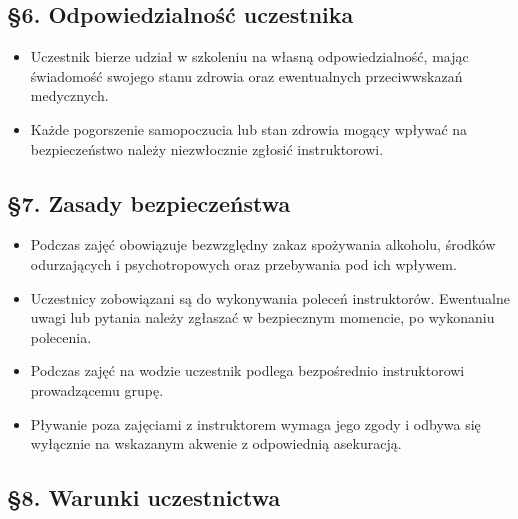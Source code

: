 \subsection*{§6. Odpowiedzialność uczestnika}

\begin{itemize}[leftmargin=1.5em, itemsep=2pt]
  \item Uczestnik bierze udział w szkoleniu na własną odpowiedzialność, mając świadomość
    swojego stanu zdrowia oraz ewentualnych przeciwwskazań medycznych.
  \item Każde pogorszenie samopoczucia lub stan zdrowia mogący wpływać na bezpieczeństwo
    należy niezwłocznie zgłosić instruktorowi.
\end{itemize}

\subsection*{§7. Zasady bezpieczeństwa}

\begin{itemize}[leftmargin=1.5em, itemsep=2pt]
  \item Podczas zajęć obowiązuje bezwzględny zakaz spożywania alkoholu, środków
    odurzających i psychotropowych oraz przebywania pod ich wpływem.
  \item Uczestnicy zobowiązani są do wykonywania poleceń instruktorów. Ewentualne uwagi
    lub pytania należy zgłaszać w bezpiecznym momencie, po wykonaniu polecenia.
  \item Podczas zajęć na wodzie uczestnik podlega bezpośrednio instruktorowi prowadzącemu
    grupę.
  \item Pływanie poza zajęciami z instruktorem wymaga jego zgody i odbywa się wyłącznie
    na wskazanym akwenie z odpowiednią asekuracją.
\end{itemize}

\subsection*{§8. Warunki uczestnictwa}

